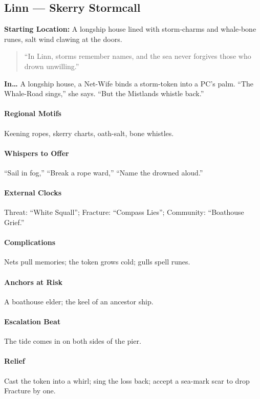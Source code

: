     \subsection*{Linn — Skerry Stormcall}
    \textbf{Starting Location:} A longship house lined with storm‑charms and whale‑bone runes, salt wind clawing at the doors.
    \begin{quote}
    “In Linn, storms remember names, and the sea never forgives those who drown unwilling.”
    \end{quote}

    \textbf{In…} A longship house, a Net-Wife binds a storm-token into a PC’s palm. ``The Whale-Road sings,'' she says. ``But the Mistlands whistle back.''
\paragraph{Regional Motifs} Keening ropes, skerry charts, oath-salt, bone whistles.
\paragraph{Whispers to Offer} ``Sail in fog,'' ``Break a rope ward,'' ``Name the drowned aloud.''
\paragraph{External Clocks} Threat: ``White Squall''; Fracture: ``Compass Lies''; Community: ``Boathouse Grief.''
\paragraph{Complications} Nets pull memories; the token grows cold; gulls spell runes.
\paragraph{Anchors at Risk} A boathouse elder; the keel of an ancestor ship.
\paragraph{Escalation Beat} The tide comes in on both sides of the pier.
\paragraph{Relief} Cast the token into a whirl; sing the loss back; accept a sea-mark scar to drop Fracture by one.
